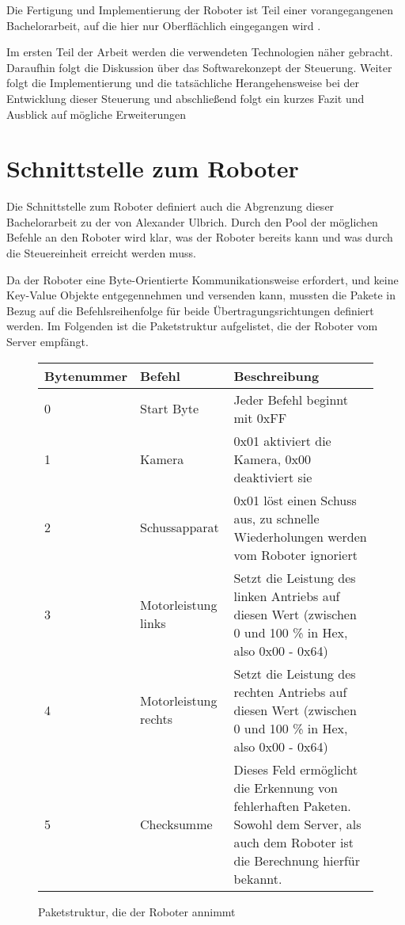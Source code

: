 Die Fertigung und Implementierung der Roboter ist Teil einer vorangegangenen Bachelorarbeit, auf die hier nur Oberflächlich eingegangen wird \cite{ALEX}. 

Im ersten Teil der Arbeit werden die verwendeten Technologien näher gebracht. Daraufhin folgt die Diskussion über das Softwarekonzept der Steuerung. Weiter folgt die Implementierung und die tatsächliche Herangehensweise bei der Entwicklung dieser Steuerung und abschließend folgt ein kurzes Fazit und Ausblick auf mögliche Erweiterungen
             



\section{Schnittstelle zum Roboter}
\label{sec:schnittstelle}
Die Schnittstelle zum Roboter definiert auch die Abgrenzung dieser Bachelorarbeit zu der von Alexander Ulbrich. Durch den Pool der möglichen Befehle an den Roboter wird klar, was der Roboter bereits kann und was durch die Steuereinheit erreicht werden muss. 

Da der Roboter eine Byte-Orientierte Kommunikationsweise erfordert, und keine Key-Value Objekte entgegennehmen und versenden kann, mussten die Pakete in Bezug auf die Befehlsreihenfolge für beide Übertragungsrichtungen definiert werden.
Im Folgenden ist die Paketstruktur aufgelistet, die der Roboter vom Server empfängt. \\

\begin{figure}[!h]
\begin{tabular}{||p{}||p{}||p{}||}
	\hline Bytenummer & Befehl & Beschreibung \\ 
	\hline 0 & Start Byte &  Jeder Befehl beginnt mit 0xFF\\ 
	\hline 1 & Kamera & 0x01 aktiviert die Kamera, 0x00 deaktiviert sie \\ 
	\hline 2 & Schussapparat & 0x01 löst einen Schuss aus, zu schnelle Wiederholungen werden vom Roboter ignoriert \\ 
	\hline 3 & Motorleistung links & Setzt die Leistung des linken Antriebs auf diesen Wert (zwischen 0 und 100 \% in Hex, also 0x00 - 0x64) \\ 
	\hline 4 & Motorleistung rechts & Setzt die Leistung des rechten Antriebs auf diesen Wert (zwischen 0 und 100 \% in Hex, also 0x00 - 0x64) \\ 
	\hline 5 & Checksumme & Dieses Feld ermöglicht die Erkennung von fehlerhaften Paketen. Sowohl dem Server, als auch dem Roboter ist die Berechnung hierfür bekannt. \\
	\hline
\end{tabular}  
\caption{Paketstruktur, die der Roboter annimmt}
\label{tab:serv_to_robot}
\end{figure}


